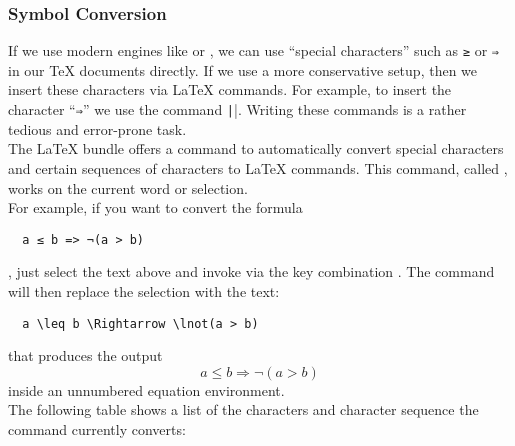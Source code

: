 \documentclass[11pt, x11names]{article}
\begin{document}
\subsubsection{Symbol Conversion}

If we use modern engines like \XeLaTeX{} or \LuaLaTeX{}, we can use “special characters” such as \texttt{≥} or \texttt{⇒} in our TeX documents directly. If we use a more conservative setup, then we insert these characters via LaTeX commands. For example, to insert the character “\texttt{⇒}” we use the command \texttt|\Rightarrow|. Writing these commands is a rather tedious and error-prone task.\\

The LaTeX bundle offers a command to automatically convert special characters and certain sequences of characters to LaTeX commands. This command, called , works on the current word or selection.\\

For example, if you want to convert the formula

\begin{verbatim}
  a ≤ b => ¬(a > b)
\end{verbatim}

, just select the text above and invoke  via the key combination \keys{\cmd + \&}. The command will then replace the selection with the text:

\begin{verbatim}
  a \leq b \Rightarrow \lnot(a > b)
\end{verbatim}

that produces the output
\[
  a \leq b \Rightarrow \lnot(a > b)
\]
inside an unnumbered equation environment.\\

The following table shows a list of the characters and character sequence the command currently converts:
\end{document}
